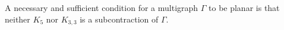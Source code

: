 A necessary and sufficient condition for a multigraph $\Gamma$ to be planar is that neither $K_5$ nor $K_{3,3}$ is a subcontraction of $\Gamma$.
